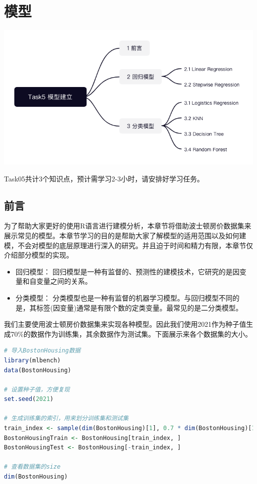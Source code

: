 \documentclass[]{ctexbook}
\begin{document}
\hypertarget{task-05}{%
\section{模型}\label{task-05}}

\includegraphics[width=1\textwidth,height=\textheight]{./image/task05_structure.png}

Task05共计3个知识点，预计需学习2-3小时，请安排好学习任务。

\hypertarget{ux524dux8a00}{%
\subsection{前言}\label{ux524dux8a00}}

为了帮助大家更好的使用R语言进行建模分析，本章节将借助波士顿房价数据集来展示常见的模型。本章节学习的目的是帮助大家了解模型的适用范围以及如何建模，不会对模型的底层原理进行深入的研究。并且迫于时间和精力有限，本章节仅介绍部分模型的实现。

\begin{itemize}
\item
  回归模型： 回归模型是一种有监督的、预测性的建模技术，它研究的是因变量和自变量之间的关系。
\item
  分类模型： 分类模型也是一种有监督的机器学习模型。与回归模型不同的是，其标签(因变量)通常是有限个数的定类变量。最常见的是二分类模型。
\end{itemize}

我们主要使用波士顿房价数据集来实现各种模型。因此我们使用2021作为种子值生成70\%的数据作为训练集，其余数据作为测试集。下面展示来各个数据集的大小。

\begin{lstlisting}[language=R]
# 导入BostonHousing数据
library(mlbench)
data(BostonHousing)

# 设置种子值，方便复现
set.seed(2021)

# 生成训练集的索引，用来划分训练集和测试集
train_index <- sample(dim(BostonHousing)[1], 0.7 * dim(BostonHousing)[1])
BostonHousingTrain <- BostonHousing[train_index, ]
BostonHousingTest <- BostonHousing[-train_index, ]

# 查看数据集的size
dim(BostonHousing)
\end{lstlisting}
\end{document}
